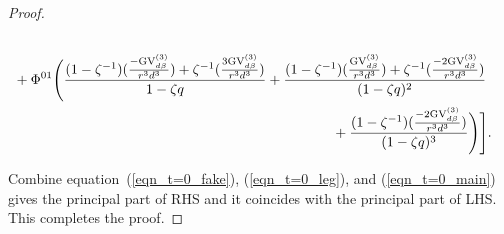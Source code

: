 \documentclass[11pt]{amsart}
\newtheorem*{main theorem*}{Main Theorem}
\theoremstyle{remark}
\numberwithin{equation}{section}
\newcommand{\GV}{{\mathrm{GV}}}
\begin{document}
\begin{proof}
\begin{equation}
\begin{split}
    \\
    &  + \Phi^{01} \Bigg(  \frac{ (1-\zeta^{-1})(\frac{-\GV^{(3)}_{d\beta} }{r^3d^3}) +\zeta^{-1} (\frac{3\GV_{d\beta}^{(3)}}{r^3d^3} ) }{1-\zeta q} + \frac{ (1-\zeta^{-1})(\frac{\GV^{(3)}_{d\beta}}{r^3d^3}) + \zeta^{-1} (\frac{-2\GV_{d\beta}^{(3)}}{r^3d^3} ) }{(1-\zeta q)^2} 
    \\
    & \hspace{80mm} + \frac{(1-\zeta^{-1})(\frac{-2\GV_{d\beta}^{(3)}}{r^3d^3}) }{(1-\zeta q)^3}\Bigg)  \Bigg].
\end{split}
\end{equation}

Combine equation~(\ref{eqn_t=0_fake}), (\ref{eqn_t=0_leg}), and (\ref{eqn_t=0_main}) gives the principal part of RHS and it coincides with the principal part of LHS. This completes the proof.
\end{proof}
\end{document}
